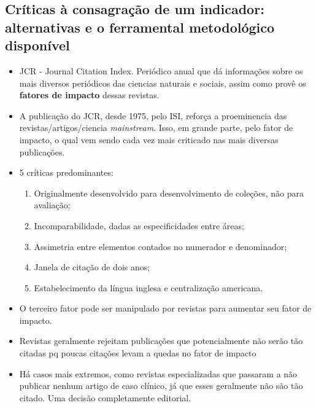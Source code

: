 \documentclass[11pt]{article}
\begin{document}
\subsection{Críticas à consagração de um indicador: alternativas e o ferramental metodológico disponível}
\label{sec:org8223829}

\begin{itemize}
\item JCR - Journal Citation Index. Periódico anual que dá informações sobre os mais diversos periódicos das ciencias naturais e sociais, assim como provê os \textbf{fatores de impacto} dessas revistas.

\item A publicação do JCR, desde 1975, pelo ISI, reforça a proeminencia das revistas/artigos/ciencia \emph{mainstream}. Isso, em grande parte, pelo fator de impacto, o qual vem sendo cada vez mais criticado nas mais diversas publicações.

\item 5 críticas predominantes:

\begin{enumerate}
\item Originalmente desenvolvido para desenvolvimento de coleções, não para avaliação;

\item Incomparabilidade, dadas as especificidades entre áreas;

\item Assimetria entre elementos contados no numerador e denominador;

\item Janela de citação de dois anos;

\item Estabelecimento da língua inglesa e centralização americana.
\end{enumerate}

\item O terceiro fator pode ser manipulado por revistas para aumentar seu fator de impacto.

\item Revistas geralmente rejeitam publicações que potencialmente não serão tão citadas pq poucas citações levam a quedas no fator de impacto

\item Há casos mais extremos, como revistas especializadas que passaram a não publicar nenhum artigo de caso clínico, já que esses geralmente não são tão citado. Uma decisão completamente editorial.


\end{itemize}
\end{document}
